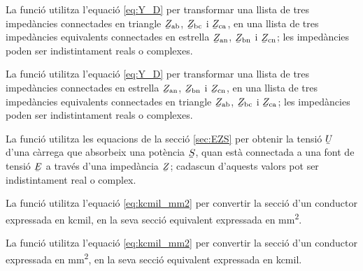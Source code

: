 


La funció  utilitza l'equació \eqref{eq:Y_D} per transformar una llista de tres impedàncies connectades en triangle $\cmplx{Z}\ped{ab}$, $\cmplx{Z}\ped{bc}$ i  $\cmplx{Z}\ped{ca}$, en una llista de tres impedàncies equivalents connectades en estrella $\cmplx{Z}\ped{an}$, $\cmplx{Z}\ped{bn}$ i $\cmplx{Z}\ped{cn}$; les impedàncies poden ser indistintament reals o complexes.




La funció  utilitza l'equació \eqref{eq:Y_D} per transformar una llista de tres impedàncies connectades en estrella $\cmplx{Z}\ped{an}$, $\cmplx{Z}\ped{bn}$ i $\cmplx{Z}\ped{cn}$, en una llista de tres impedàncies equivalents connectades en triangle $\cmplx{Z}\ped{ab}$, $\cmplx{Z}\ped{bc}$ i  $\cmplx{Z}\ped{ca}$; les impedàncies poden ser indistintament reals o complexes.




La funció  utilitza les equacions de la secció \vref{sec:EZS} per obtenir la tensió $\cmplx{U}$ d'una càrrega que absorbeix una potència $\cmplx{S}$, quan està connectada a una font de tensió $\cmplx{E}$ a través d'una impedància $\cmplx{Z}$; cadascun d'aquests valors pot ser indistintament real o complex.




La funció  utilitza l'equació \eqref{eq:kcmil_mm2} per convertir la secció d'un conductor expressada en \unit{kcmil}, en la seva secció equivalent expressada en \unit{mm^2}.




La funció  utilitza l'equació \eqref{eq:kcmil_mm2} per convertir la secció d'un conductor expressada en \unit{mm^2}, en la seva secció equivalent expressada en \unit{kcmil}.

